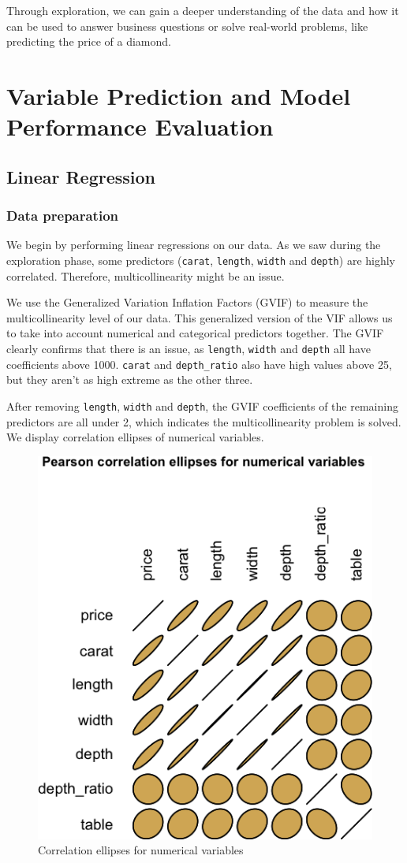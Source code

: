 \documentclass[
  paper=a4,
  ,captions=tableheading
]{scrartcl}
\begin{document}
Through exploration, we can gain a deeper understanding of the data and
how it can be used to answer business questions or solve real-world
problems, like predicting the price of a diamond.

\hypertarget{variable-prediction-and-model-performance-evaluation}{%
\section{Variable Prediction and Model Performance
Evaluation}\label{variable-prediction-and-model-performance-evaluation}}

\hypertarget{linear-regression}{%
\subsection{Linear Regression}\label{linear-regression}}

\hypertarget{data-preparation}{%
\subsubsection{Data preparation}\label{data-preparation}}

We begin by performing linear regressions on our data. As we saw during
the exploration phase, some predictors (\texttt{carat}, \texttt{length},
\texttt{width} and \texttt{depth}) are highly correlated. Therefore,
multicollinearity might be an issue.

We use the Generalized Variation Inflation Factors (GVIF) to measure the
multicollinearity level of our data. This generalized version of the VIF
allows us to take into account numerical and categorical predictors
together. The GVIF clearly confirms that there is an issue, as
\texttt{length}, \texttt{width} and \texttt{depth} all have coefficients
above 1000. \texttt{carat} and \texttt{depth\_ratio} also have high
values above 25, but they aren't as high extreme as the other three.

After removing \texttt{length}, \texttt{width} and \texttt{depth}, the
GVIF coefficients of the remaining predictors are all under 2, which
indicates the multicollinearity problem is solved. We display
correlation ellipses of numerical variables.

\begin{figure}[H]

{\centering \includegraphics[width=0.4\linewidth,]{Diamonds_PDF_files/figure-latex/uncorrelated-ellipses-1}

}

\caption{Correlation ellipses for numerical variables}\label{fig:uncorrelated-ellipses}
\end{figure}
\end{document}
